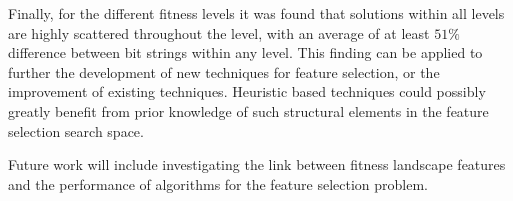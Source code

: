 \documentclass[journal,comsoc]{IEEEtran}
\begin{document}
Finally, for the different fitness levels it was found that solutions within all levels are highly scattered throughout the level, with an average of at least $51\%$ difference between bit strings within any level. This finding can be applied to further the development of new techniques for feature selection, or the improvement of existing techniques. Heuristic based techniques could possibly greatly benefit from prior knowledge of such structural elements in the feature selection search space. 

Future work will include investigating the link between fitness landscape features and the performance of algorithms for the feature selection problem.



%



\ifCLASSOPTIONcaptionsoff
  \newpage
\fi
\end{document}
